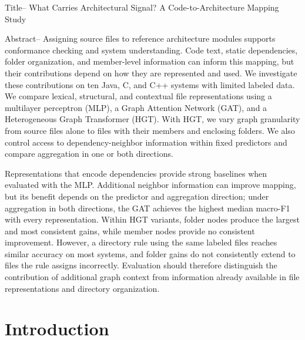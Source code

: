 \newcommand{\best}[1]{\cellcolor{CadetBlue!15}{#1}}
\newcommand{\nb}[1]{\cellcolor{pink!30}{#1}}

\newcommand{\zs}{UXC\textsubscript{ZS}}
\newcommand{\ft}{UXC\textsubscript{FT}}

\newcommand{\f}[1]{#1$_{\text{F}}$}
\newcommand{\ff}[1]{#1$_{\text{FF}}$}
\newcommand{\fm}[1]{#1$_{\text{FM}}$}
\newcommand{\ffm}[1]{#1$_{\text{FFM}}$}

Title-- What Carries Architectural Signal? A Code-to-Architecture Mapping Study

Abstract-- Assigning source files to reference architecture modules supports conformance checking and system understanding. Code text, static dependencies, folder organization, and member-level information can inform this mapping, but their contributions depend on how they are represented and used. We investigate these contributions on ten Java, C, and C++ systems with limited labeled data. We compare lexical, structural, and contextual file representations using a multilayer perceptron (MLP), a Graph Attention Network (GAT), and a Heterogeneous Graph Transformer (HGT). With HGT, we vary graph granularity from source files alone to files with their members and enclosing folders. We also control access to dependency-neighbor information within fixed predictors and compare aggregation in one or both directions.

Representations that encode dependencies provide strong baselines when evaluated with the MLP. Additional neighbor information can improve mapping, but its benefit depends on the predictor and aggregation direction; under aggregation in both directions, the GAT achieves the highest median macro-F1 with every representation. Within HGT variants, folder nodes produce the largest and most consistent gains, while member nodes provide no consistent improvement. However, a directory rule using the same labeled files reaches similar accuracy on most systems, and folder gains do not consistently extend to files the rule assigns incorrectly. Evaluation should therefore distinguish the contribution of additional graph context from information already available in file representations and directory organization.

\section{Introduction\label{sec:intro}}

